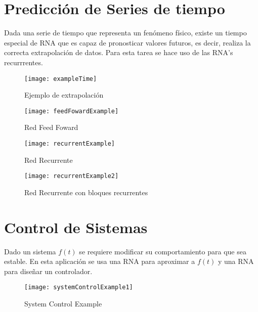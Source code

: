 \documentclass{article}
\begin{document}
\section{Predicción de Series de tiempo}
Dada una serie de tiempo que representa un fenómeno físico, existe un tiempo especial de RNA que es capaz de pronosticar valores futuros, es decir, realiza la correcta extrapolación de datos. Para esta tarea se hace uso de las RNA's recurrrentes.
\begin{figure}
	\centering
	\caption{Ejemplo de extrapolación}
	\texttt{[image: exampleTime]}	
\end{figure}

\begin{figure}
	\centering
	\caption{Red Feed Foward}
	\texttt{[image: feedFowardExample]}	
\end{figure}

\begin{figure}
	\centering
	\caption{Red Recurrente}
	\texttt{[image: recurrentExample]}	
\end{figure}

\begin{figure}
	\centering
	\caption{Red Recurrente con bloques recurrentes}
	\texttt{[image: recurrentExample2]}	
\end{figure}

\section{Control de Sistemas}
Dado un sistema $f(t)$ se requiere modificar su comportamiento para que sea estable. En esta aplicación se usa una RNA para aproximar a $f(t)$ y una RNA para diseñar un controlador.

\begin{figure}
	\centering
	\caption{System Control Example}
	\texttt{[image: systemControlExample1]}	
\end{figure}
\end{document}
